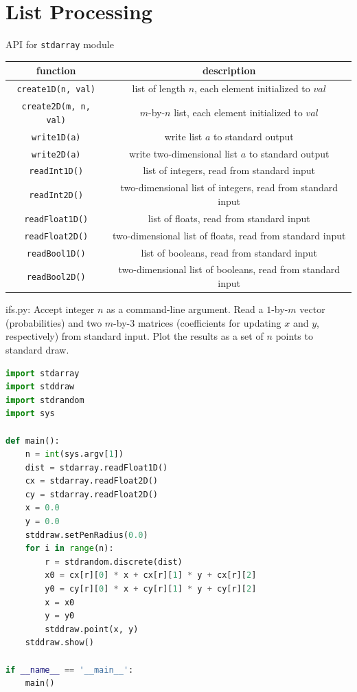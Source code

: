 \documentclass[8pt,a4paper,compress]{beamer}
\begin{document}
\section{List Processing}
\begin{frame}[fragile]
\pause

API for \lstinline{stdarray} module
\begin{center}
\begin{tabular}{cc}
function & description \\ \hline
\lstinline$create1D(n, val)$ & list of length $n$, each element initialized to $val$ \\
\lstinline$create2D(m, n, val)$ & $m$-by-$n$ list, each element initialized to $val$ \\
\lstinline$write1D(a)$ & write list $a$ to standard output \\
\lstinline$write2D(a)$ & write two-dimensional list $a$ to standard output \\
\lstinline$readInt1D()$ & list of integers, read from standard input \\
\lstinline$readInt2D()$ & two-dimensional list of integers, read from standard input \\
\lstinline$readFloat1D()$ & list of floats, read from standard input \\
\lstinline$readFloat2D()$ & two-dimensional list of floats, read from standard input \\
\lstinline$readBool1D()$ & list of booleans, read from standard input \\
\lstinline$readBool2D()$ & two-dimensional list of booleans, read from standard input
\end{tabular} 
\end{center}
\end{frame}

\begin{frame}[fragile]
\pause

\begin{framed}
\tiny ifs.py: Accept integer $n$ as a command-line argument. Read a $1$-by-$m$ vector (probabilities) and two $m$-by-$3$ matrices (coefficients for updating $x$ and $y$, respectively) from standard input. Plot the results as a set of $n$ points to standard draw.
\end{framed}

\begin{lstlisting}[language=Python]
import stdarray
import stddraw
import stdrandom
import sys

def main():
    n = int(sys.argv[1])
    dist = stdarray.readFloat1D()
    cx = stdarray.readFloat2D()
    cy = stdarray.readFloat2D()
    x = 0.0
    y = 0.0
    stddraw.setPenRadius(0.0)
    for i in range(n):
        r = stdrandom.discrete(dist)
        x0 = cx[r][0] * x + cx[r][1] * y + cx[r][2]
        y0 = cy[r][0] * x + cy[r][1] * y + cy[r][2]
        x = x0
        y = y0
        stddraw.point(x, y)
    stddraw.show()

if __name__ == '__main__':
    main()
\end{lstlisting}
\end{frame}
\end{document}
